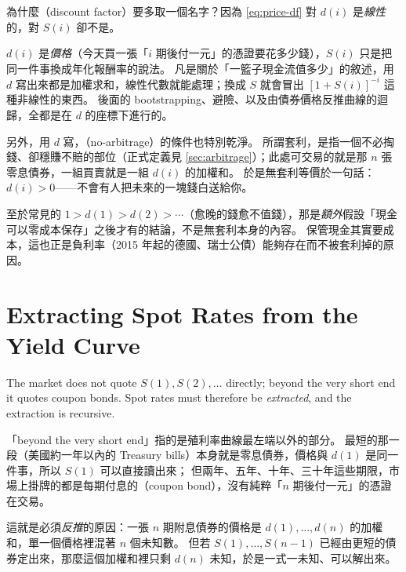 \begin{remark}
	為什麼（discount factor）要多取一個名字？因為 \eqref{eq:price-df} 對 $d(i)$ 是\emph{線性}的，對 $S(i)$ 卻不是。

	$d(i)$ 是\emph{價格}（今天買一張「$i$ 期後付一元」的憑證要花多少錢），$S(i)$ 只是把同一件事換成年化報酬率的說法。
	凡是關於「一籃子現金流值多少」的敘述，用 $d$ 寫出來都是加權求和，線性代數就能處理；換成 $S$ 就會冒出 $[1+S(i)]^{-i}$ 這種非線性的東西。
	後面的 bootstrapping、避險、以及由債券價格反推曲線的迴歸，全都是在 $d$ 的座標下進行的。

	另外，用 $d$ 寫，（no-arbitrage）的條件也特別乾淨。
	所謂套利，是指一個不必掏錢、卻穩賺不賠的部位（正式定義見 \autoref{sec:arbitrage}）；此處可交易的就是那 $n$ 張零息債券，一組買賣就是一組 $d(i)$ 的加權和。
	於是無套利等價於一句話：$d(i) > 0$——不會有人把未來的一塊錢白送給你。

	至於常見的 $1 > d(1) > d(2) > \cdots$（愈晚的錢愈不值錢），那是\emph{額外}假設「現金可以零成本保存」之後才有的結論，不是無套利本身的內容。
	保管現金其實要成本，這也正是負利率（2015 年起的德國、瑞士公債）能夠存在而不被套利掉的原因。
\end{remark}
\suppend

\section{Extracting Spot Rates from the Yield Curve}
\label{sec:bootstrap}


The market does not quote $S(1),S(2),\dots$ directly; beyond the very short end it quotes coupon bonds.
Spot rates must therefore be \emph{extracted}, and the extraction is recursive.

\suppstart
\begin{remark}
	「beyond the very short end」指的是殖利率曲線最左端以外的部分。
	最短的那一段（美國約一年以內的 Treasury bills）本身就是零息債券，價格與 $d(1)$ 是同一件事，所以 $S(1)$ 可以直接讀出來；
	但兩年、五年、十年、三十年這些期限，市場上掛牌的都是每期付息的（coupon bond），沒有純粹「$n$ 期後付一元」的憑證在交易。

	這就是必須\emph{反推}的原因：一張 $n$ 期附息債券的價格是 $d(1),\dots,d(n)$ 的加權和，單一個價格裡混著 $n$ 個未知數。
	但若 $S(1),\dots,S(n-1)$ 已經由更短的債券定出來，那麼這個加權和裡只剩 $d(n)$ 未知，於是一式一未知、可以解出來。
\end{remark}
\suppend

